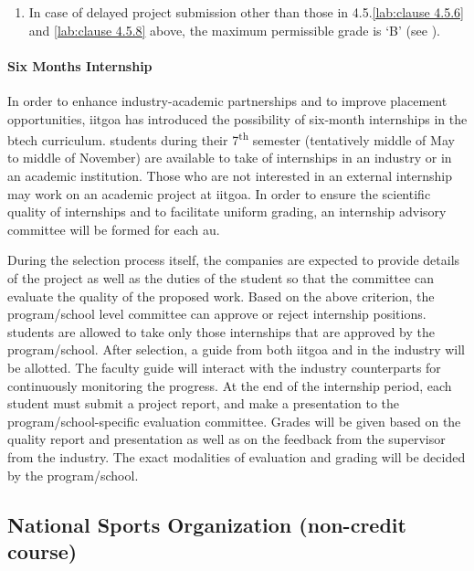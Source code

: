 \begin {enumerate}[leftmargin=15mm]
    \item In case of delayed project submission other than those in 4.5.\ref{lab:clause 4.5.6} and \ref{lab:clause 4.5.8} above, the maximum permissible grade is ‘B’ (see ).
\end{enumerate}

\paragraph{Six Months Internship} In order to enhance industry-academic partnerships and to improve placement opportunities, \acrshort{iitgoa} has introduced the possibility of six-month internships in the \acrshort{btech} curriculum. \Glspl{student} during their 7\textsuperscript{th} semester (tentatively middle of May to middle of November) are available to take of internships in an industry or in an academic institution. Those who are not interested in an external internship may work on an academic project at \acrshort{iitgoa}. In order to ensure the scientific quality of internships and to facilitate uniform grading, an internship advisory committee will be formed for each \acrshort{au}.

During the selection process itself, the companies are expected to provide details of the project as well as the duties of the \gls{student} so that the committee can evaluate the quality of the proposed work. Based on the above criterion, the \gls{program}/\gls{school} level committee can approve or reject internship positions. \glspl{student} are allowed to take only those internships that are approved by the \gls{program}/\gls{school}. After selection, a guide from both \acrshort{iitgoa} and in the industry will be allotted. The \gls{faculty} guide will interact with the industry counterparts for continuously monitoring the progress. At the end of the internship period, each \gls{student} must submit a project report, and make a presentation to the \gls{program}/\gls{school}-specific evaluation committee. Grades will be given based on the quality report and presentation as well as on the feedback from the supervisor from the industry. The exact modalities of evaluation and grading will be decided by the \gls{program}/\gls{school}.

\subsection{National Sports Organization (non-credit course)}

